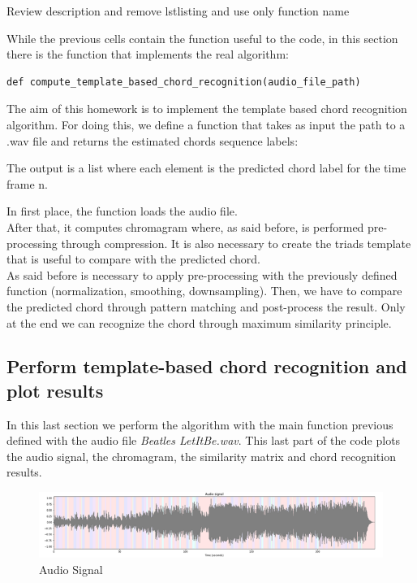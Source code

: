 \documentclass[
	12pt, %
]{fphw}
\begin{document}
\color{red}Review description and remove lstlisting and use only function name\color{black}

While the previous cells contain the function useful to the code, in this section there is the function that implements the real algorithm:\\

\begin{lstlisting}
def compute_template_based_chord_recognition(audio_file_path)
\end{lstlisting}

The aim of this homework is to implement the template based chord recognition algorithm. For doing this, we define a function that takes as input the path to a .wav file and returns the estimated chords sequence labels:

The output is a list where each element is the predicted chord label for the time frame n.

In first place, the function loads the audio file.\\ After that, it computes chromagram where, as said before, is performed pre-processing through compression. It is also necessary to create the triads template that is useful to compare with the predicted chord.\\
As said before is necessary to apply pre-processing with the previously defined function (normalization, smoothing, downsampling).
Then, we have to compare the predicted chord through pattern matching and post-process the result.
Only at the end we can recognize the chord through maximum similarity principle.\\

\subsection*{Perform template-based chord recognition and plot results}

In this last section we perform the algorithm with the main function previous defined with the audio file \emph{Beatles LetItBe.wav}. This last part of the code plots the audio signal, the chromagram, the similarity matrix and chord recognition results.

\begin{figure}[H]
 \centering
 \includegraphics[scale=1]{./images/1_audio_signal.png}
 \caption{Audio Signal}
\end{figure}
\end{document}
